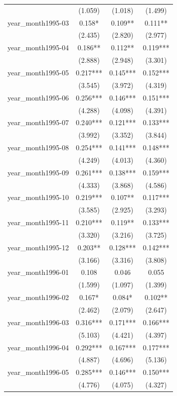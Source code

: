 \documentclass[
  norsk,
  a4paper,
]{article}
\begin{document}
\begin{table}
\begin{tabular*}{\linewidth}{@{\extracolsep{\fill}}lccc}
 & (1.059) & (1.018) & (1.499) \\ 
year\_month1995-03 & 0.158* & 0.109** & 0.111** \\ 
 & (2.435) & (2.820) & (2.977) \\ 
year\_month1995-04 & 0.186** & 0.112** & 0.119*** \\ 
 & (2.888) & (2.948) & (3.301) \\ 
year\_month1995-05 & 0.217*** & 0.145*** & 0.152*** \\ 
 & (3.545) & (3.972) & (4.319) \\ 
year\_month1995-06 & 0.256*** & 0.146*** & 0.151*** \\ 
 & (4.288) & (4.098) & (4.391) \\ 
year\_month1995-07 & 0.240*** & 0.121*** & 0.133*** \\ 
 & (3.992) & (3.352) & (3.844) \\ 
year\_month1995-08 & 0.254*** & 0.141*** & 0.148*** \\ 
 & (4.249) & (4.013) & (4.360) \\ 
year\_month1995-09 & 0.261*** & 0.138*** & 0.159*** \\ 
 & (4.333) & (3.868) & (4.586) \\ 
year\_month1995-10 & 0.219*** & 0.107** & 0.117*** \\ 
 & (3.585) & (2.925) & (3.293) \\ 
year\_month1995-11 & 0.210*** & 0.119** & 0.133*** \\ 
 & (3.320) & (3.216) & (3.725) \\ 
year\_month1995-12 & 0.203** & 0.128*** & 0.142*** \\ 
 & (3.166) & (3.316) & (3.808) \\ 
year\_month1996-01 & 0.108 & 0.046 & 0.055 \\ 
 & (1.599) & (1.097) & (1.399) \\ 
year\_month1996-02 & 0.167* & 0.084* & 0.102** \\ 
 & (2.462) & (2.079) & (2.647) \\ 
year\_month1996-03 & 0.316*** & 0.171*** & 0.166*** \\ 
 & (5.103) & (4.421) & (4.397) \\ 
year\_month1996-04 & 0.292*** & 0.167*** & 0.177*** \\ 
 & (4.887) & (4.696) & (5.136) \\ 
year\_month1996-05 & 0.285*** & 0.146*** & 0.150*** \\ 
 & (4.776) & (4.075) & (4.327) \\ 

\end{tabular*}
\end{table}
\end{document}
